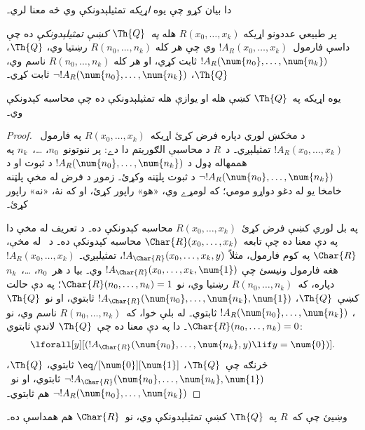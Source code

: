 \documentclass[../../../include/open-logic-section]{subfiles}
\begin{document}


دا بيان کړو چې يوه \emph{اړيکه} تمثيلېدونکې وي څه معنا لري۔

\begin{defn}
 پر طبيعي عددونو اړيکه
$R(x_0,\dots,x_k)$ هله \emph{په~$\Th{Q}$ کښې تمثيلېدونکې} ده چې
داسې فارمول~$!A_R(x_0,\dots,x_k)$ وي چې هر کله
$R(n_0,\dots,n_k)$ رښتيا وي، $\Th{Q}$،
$!A_R(\num{n_0},\dots,\num{n_k})$ ثابت کړي، او هر کله
$R(n_0,\dots,n_k)$ ناسم وي، $\Th{Q}$،
$\lnot !A_R(\num{n_0}, \dots, \num{n_k})$ ثابت کړي۔
\end{defn}

\begin{thm}
 يوه اړيکه په~$\Th{Q}$ کښې هله او
يوازې هله تمثيلېدونکې ده چې محاسبه کېدونکې وي۔
\end{thm}

\begin{proof}
د مخکښ لوري دپاره فرض کړئ اړيکه~$R(x_0,\dots,x_k)$ په
فارمول~$!A_R(x_0,\dots,x_k)$ تمثيلېږي۔ د~$R$ د محاسبې الګوريتم دا
دے: پر ننوتونو~$n_0$، \dots،~$n_k$ په هممهاله ډول د
$!A_R(\num{n_0}, \dots, \num{n_k})$ د ثبوت او د
$\lnot !A_R(\num{n_0}, \dots, \num{n_k})$ د ثبوت پلټنه وکړئ۔ زموږ
د فرض له مخې پلټنه خامخا يو له دغو دواړو مومي؛ که لومړے وي، «هو»
راپور کړئ، او که نۀ، «نه» راپور کړئ۔

په بل لوري کښې فرض کړئ~$R(x_0, \dots, x_k)$ محاسبه کېدونکې ده۔ د
تعريف له مخې دا په دې معنا ده چې تابعه~$\Char{R}(x_0, \dots, x_k)$
محاسبه کېدونکې ده۔ د~ له
مخې، $\Char{R}$ په کوم فارمول، مثلاً
$!A_{\Char{R}}(x_0, \dots, x_k, y)$، تمثيلېږي۔
$!A_R(x_0, \dots, x_k)$ هغه فارمول ونيسئ چې
$!A_{\Char{R}}(x_0, \dots, x_k, \num{1})$ وي۔ بيا د هر~$n_0$،
\dots،~$n_k$ دپاره، که~$R(n_0, \dots, n_k)$ رښتيا وي، نو
$\Char{R}(n_0, \dots, n_k) = 1$؛ په دې حالت کښې~$\Th{Q}$،
$!A_{\Char{R}}(\num{n_0}, \dots, \num{n_k}, \num{1})$ ثابتوي، او
نو~$\Th{Q}$، $!A_R(\num{n_0}, \dots, \num{n_k})$ ثابتوي۔ له بلې
خوا، که~$R(n_0, \dots, n_k)$ ناسم وي، نو
$\Char{R}(n_0, \dots, n_k) = 0$۔ دا په دې معنا ده چې~$\Th{Q}$
لاندې ثابتوي:
\[
\lforall[y][(!A_{\Char{R}}(\num{n_0}, \dots, \num{n_k}, y) \lif y =
  \num{0})].
\]
څرنګه چې~$\Th{Q}$، $\eq/[\num{0}][\num{1}]$ ثابتوي، $\Th{Q}$،
$\lnot !A_{\Char{R}}(\num{n_0}, \dots, \num{n_k}, \num{1})$
ثابتوي، او نو~$\lnot !A_R(\num{n_0}, \dots, \num{n_k})$ هم
ثابتوي۔
\end{proof}

\begin{prob}
وښيئ چې که~$R$ په~$\Th{Q}$ کښې تمثيلېدونکې وي، نو~$\Char{R}$ هم
همداسې ده۔
\end{prob}
\end{document}
